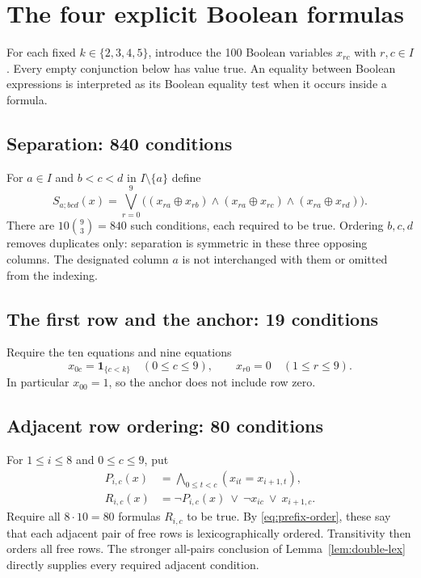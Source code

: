 \documentclass[11pt]{article}
\theoremstyle{definition}
\theoremstyle{remark}
\newcommand{\I}{I}
\newcommand{\ind}[1]{\mathbf{1}_{\{#1\}}}
\begin{document}
\section{The four explicit Boolean formulas}
\label{sec:formulas}

For each fixed $k\in\{2,3,4,5\}$, introduce the 100 Boolean variables
$x_{rc}$ with $r,c\in\I$. Every empty conjunction below has value
true. An equality between Boolean expressions is interpreted as its
Boolean equality test when it occurs inside a formula.

\subsection{Separation: 840 conditions}
For $a\in\I$ and $b<c<d$ in $\I\setminus\{a\}$ define
\begin{equation}
\label{eq:sep-formula}
 S_{a;bcd}(x)=
 \bigvee_{r=0}^{9}
 \bigl((x_{ra}\oplus x_{rb})\wedge
       (x_{ra}\oplus x_{rc})\wedge
       (x_{ra}\oplus x_{rd})\bigr).
\end{equation}
There are $10\binom{9}{3}=840$ such conditions, each required to be
true. Ordering $b,c,d$ removes duplicates only: separation is symmetric
in these three opposing columns. The designated column $a$ is not
interchanged with them or omitted from the indexing.

\subsection{The first row and the anchor: 19 conditions}
Require the ten equations and nine equations
\begin{equation}
\label{eq:fixed-formula}
 x_{0c}=\ind{c<k}\quad(0\leq c\leq9),\qquad
 x_{r0}=0\quad(1\leq r\leq9).
\end{equation}
In particular $x_{00}=1$, so the anchor does not include row zero.

\subsection{Adjacent row ordering: 80 conditions}
For $1\leq i\leq8$ and $0\leq c\leq9$, put
\begin{align}
 P_{i,c}(x)&=\bigwedge_{0\leq t<c}(x_{it}=x_{i+1,t}),\nonumber\\
\label{eq:row-formula}
 R_{i,c}(x)&=\neg P_{i,c}(x)\ \vee\ \neg x_{ic}\ \vee\ x_{i+1,c}.
\end{align}
Require all $8\cdot10=80$ formulas $R_{i,c}$ to be true. By
\eqref{eq:prefix-order}, these say that each adjacent pair of free
rows is lexicographically ordered. Transitivity then orders all free
rows. The stronger all-pairs conclusion of
Lemma~\ref{lem:double-lex} directly supplies every required adjacent
condition.
\end{document}
